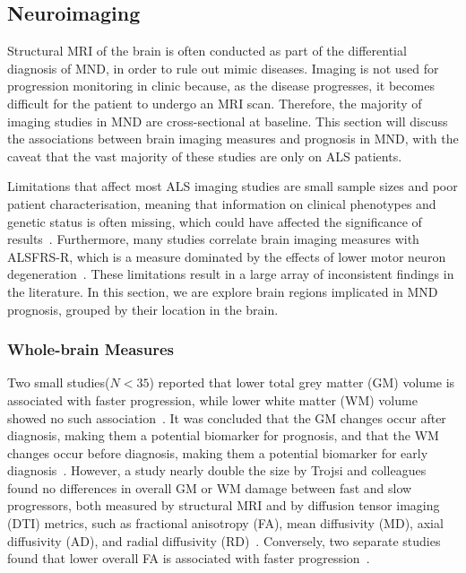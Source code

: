 \subsection{Neuroimaging}

Structural MRI of the brain is often conducted as part of the differential diagnosis of MND, in order to rule out mimic diseases.
Imaging is not used for progression monitoring in clinic because, as the disease progresses, it becomes difficult for the patient to undergo an MRI scan.
Therefore, the majority of imaging studies in MND are cross-sectional at baseline.
This section will discuss the associations between brain imaging measures and prognosis in MND, with the caveat that the vast majority of these studies are only on ALS patients.

Limitations that affect most ALS imaging studies are small sample sizes and poor patient characterisation, meaning that information on clinical phenotypes and genetic status is often missing, which could have affected the significance of results~\cite{bedeLessonsALSImaging2014}.
Furthermore, many studies correlate brain imaging measures with ALSFRS-R, which is a measure dominated by the effects of lower motor neuron degeneration~\cite{bedeLessonsALSImaging2014}.
These limitations result in a large array of inconsistent findings in the literature.
In this section, we are explore brain regions implicated in MND prognosis, grouped by their location in the brain.

\subsubsection*{Whole-brain Measures}
Two small studies($N<35$) reported that lower total grey matter (GM) volume is associated with faster progression, while lower white matter (WM) volume showed no such association~\cite{elmendiliAssociationBrainUpper2023, bedeLongitudinalStructuralChanges2018}.
It was concluded that the GM changes occur after diagnosis, making them a potential biomarker for prognosis, and that the WM changes occur before diagnosis, making them a potential biomarker for early diagnosis~\cite{bedeLongitudinalStructuralChanges2018}.
However, a study nearly double the size by Trojsi and colleagues found no differences in overall GM or WM damage between fast and slow progressors, both measured by structural MRI and by diffusion tensor imaging (DTI) metrics, such as fractional anisotropy (FA), mean diffusivity (MD), axial diffusivity (AD), and radial diffusivity (RD)~\cite{trojsiRestingStateFunctional2021}.
Conversely, two separate studies found that lower overall FA is associated with faster progression~\cite{sendaStructuralMRICorrelates2017, baldaranovLongitudinalDiffusionTensor2017}.

